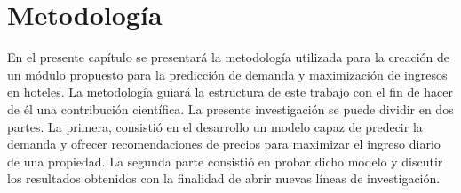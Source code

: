 \chapter{Metodología}
\label{ch:metodologia}

En el presente capítulo se presentará la metodología utilizada para la creación de un módulo propuesto para la predicción de demanda y maximización de ingresos en hoteles. La metodología guiará la estructura de este trabajo con el fin de hacer de él una contribución científica. La presente investigación se puede dividir en dos partes. La primera, consistió en el desarrollo un modelo capaz de predecir la demanda y ofrecer recomendaciones de precios para maximizar el ingreso diario de una propiedad. La segunda parte consistió en probar dicho modelo y discutir los resultados obtenidos con la finalidad de abrir nuevas líneas de investigación.